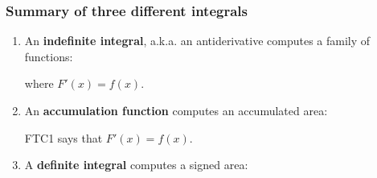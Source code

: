 \documentclass[10pt,t,handout,ignorenonframetext,aspectratio=169]{beamer}
\begin{document}
\begin{frame}
  \frametitle{Summary of three different integrals}
  \begingroup
  \small
  \begin{enumerate}
  \item An \textbf{indefinite integral}, a.k.a. an antiderivative computes a
    family of functions:
    \note{
      \[
        \int f(x) \d x = \text{``a class of functions whose derivative is $f$''}
      \]
    }
    \begin{center}
      \begin{tcolorbox}[width=0.5\linewidth]
        \vspace{-1em}
        \begin{image}[0.95\linewidth]
        \end{image}
        \vspace{-1em}
      \end{tcolorbox}
    \end{center}
    where $F'(x) = f(x)$.
  \item An \textbf{accumulation function} computes an accumulated area:
    \note{
      \[
        \int_a^x f(t) \d t = \text{``a function $F$ whose derivative is $f$''}
      \]
    }
    \begin{center}
      \begin{tcolorbox}[width=0.5\linewidth]
        \vspace{-1em}
        \begin{image}[0.95\linewidth]
        \end{image}
        \vspace{-1em}
      \end{tcolorbox}
    \end{center}
    FTC1 says that $F'(x) = f(x)$.
  \item A \textbf{definite integral} computes a signed area:
    \note{
      \[
        \int_a^b f(x) \d x = \text{``the signed area between the $x$-axis and $f$''}
      \]
    }
    \begin{center}

\end{center}
\end{enumerate}
\end{frame}
\end{document}
